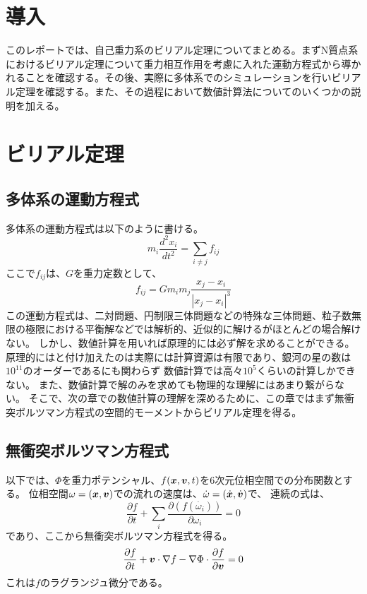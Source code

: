 \documentclass{jsarticle}
\begin{document}
\fi
\section  {導入}
このレポートでは、自己重力系のビリアル定理についてまとめる。まずN質点系におけるビリアル定理について重力相互作用を考慮に入れた運動方程式から導かれることを確認する。その後、実際に多体系でのシミュレーションを行いビリアル定理を確認する。また、その過程において数値計算法についてのいくつかの説明を加える。
\section  {ビリアル定理}
\subsection{多体系の運動方程式}
多体系の運動方程式は以下のように書ける。
\begin{equation}
	m_i \frac{d^2x_i}{dt^2} = \sum_{i \neq j} f_{ij}
\end{equation}	
ここで$f_{ij}$は、$G$を重力定数として、
\begin{equation}
	f_{ij} = G m_i m_j \frac{x_j - x_i}{|x_j - x_i|^3}
\end{equation}	
この運動方程式は、二対問題、円制限三体問題などの特殊な三体問題、粒子数無限の極限における平衡解などでは解析的、近似的に解けるがほとんどの場合解けない。
しかし、数値計算を用いれば原理的には必ず解を求めることができる。原理的にはと付け加えたのは実際には計算資源は有限であり、銀河の星の数は$10^{11}$のオーダーであるにも関わらず
数値計算では高々$10^5$くらいの計算しかできない。
また、数値計算で解のみを求めても物理的な理解にはあまり繋がらない。
そこで、次の章での数値計算の理解を深めるために、この章ではまず無衝突ボルツマン方程式の空間的モーメントからビリアル定理を得る。

\subsection{無衝突ボルツマン方程式}
以下では、$\Phi$を重力ポテンシャル、$f(\bm{x}, \bm{v}, t)$を6次元位相空間での分布関数とする。
位相空間$\omega = (\bm{x}, \bm{v})$での流れの速度は、$\dot{\omega} = (\dot{\bm{x}}, \dot{\bm{v}})$で、
連続の式は、
\begin{equation}	
	\frac{\partial f}{\partial t} + \sum_i \frac{\partial (f(\dot{\omega_i}))}{\partial \omega_i} = 0
\end{equation}	
であり、ここから無衝突ボルツマン方程式を得る。
\begin{equation}	
	\label{bolzman}
	\frac{\partial f}{\partial t} + \bm{v}\cdot\nabla f - \nabla\Phi\cdot\frac{\partial f}{\partial \bm{v}}= 0
\end{equation}	
これは$f$のラグランジュ微分である。
\end{document}
